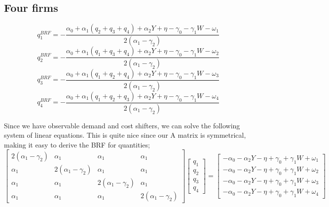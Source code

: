 \documentclass[12pt]{article}
\begin{document}
\subsection{Four firms}
$$q_1^{BRF} =  - \frac{\alpha_0 + \alpha_1(q_2+q_3+q_4) + \alpha_2 Y + \eta - \gamma_0 - \gamma_1W - \omega_1}{2(\alpha_1 - \gamma_2)} $$
$$q_2^{BRF} =  - \frac{\alpha_0 + \alpha_1(q_1+q_3+q_4) + \alpha_2 Y + \eta - \gamma_0 - \gamma_1W - \omega_2}{2(\alpha_1 - \gamma_2)} $$
$$q_3^{BRF} =  - \frac{\alpha_0 + \alpha_1(q_1+q_2+q_4) + \alpha_2 Y + \eta - \gamma_0 - \gamma_1W - \omega_3}{2(\alpha_1 - \gamma_2)} $$
$$q_4^{BRF} =  - \frac{\alpha_0 + \alpha_1(q_1+q_2+q_3) + \alpha_2 Y + \eta - \gamma_0 - \gamma_1W - \omega_4}{2(\alpha_1 - \gamma_2)} $$

Since we have observable demand and cost shifters, we can solve the following system of linear equations. This is quite nice since our A matrix is symmetrical, making it easy to derive the BRF for quantities;
\[
\begin{bmatrix}
2(\alpha_1-\gamma_2) & \alpha_1 & \alpha_1 & \alpha_1 \\
\alpha_1 & 2(\alpha_1-\gamma_2) & \alpha_1 & \alpha_1 \\
\alpha_1 & \alpha_1 & 2(\alpha_1-\gamma_2) & \alpha_1 \\
\alpha_1 & \alpha_1 & \alpha_1 & 2(\alpha_1-\gamma_2)
\end{bmatrix}
\begin{bmatrix}
q_1 \\ q_2 \\ q_3 \\ q_4
\end{bmatrix}
=
\begin{bmatrix}
-\alpha_0 - \alpha_2 Y - \eta + \gamma_0 + \gamma_1 W + \omega_1 \\
-\alpha_0 - \alpha_2 Y - \eta + \gamma_0 + \gamma_1 W + \omega_2 \\
-\alpha_0 - \alpha_2 Y - \eta + \gamma_0 + \gamma_1 W + \omega_3 \\
-\alpha_0 - \alpha_2 Y - \eta + \gamma_0 + \gamma_1 W + \omega_4
\end{bmatrix}
\]
\newpage
\end{document}
